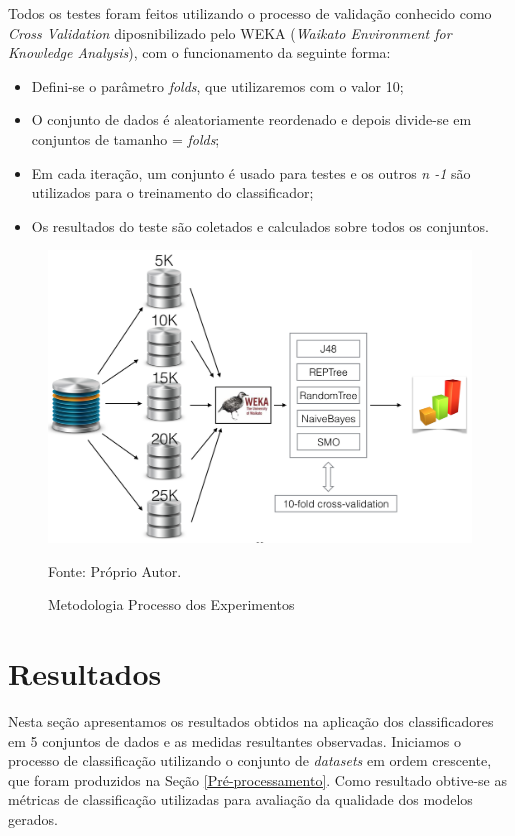 \documentclass[
	12pt,				%
	openright,			%
	oneside,	
	a4paper,				%
	english,				%
	brazil				%
]{abntex2/abntex2} %
\begin{document}
	Todos os testes foram feitos utilizando o processo de validação conhecido como \textit{Cross Validation} diposnibilizado pelo WEKA (\textit{Waikato Environment for Knowledge Analysis}), com o funcionamento da seguinte forma:
	\begin{itemize}
		\item Defini-se o parâmetro \textit{folds}, que utilizaremos com o valor 10;
		\item O conjunto de dados é aleatoriamente reordenado e depois divide-se em conjuntos de tamanho = \textit{folds};
		\item Em cada iteração, um conjunto é usado para testes e os outros \textit{n -1} são utilizados para o treinamento do classificador;
		\item Os resultados do teste são coletados e calculados sobre todos os conjuntos.
	\end{itemize}
	 
	
	\begin{figure}[!htb]
		\caption{\label{figmetodologiaExperimentos} Metodologia Processo dos Experimentos}
		\begin{center}
			\includegraphics[scale=0.55]{img/metodologiaExperimentos.png}
		\end{center}
		Fonte: Próprio Autor.
	\end{figure}
	
	\section{Resultados}
	
	Nesta seção apresentamos os resultados obtidos na aplicação dos classificadores em  5  conjuntos de dados e as medidas resultantes observadas. Iniciamos o processo de classificação utilizando o conjunto de \textit{datasets} em ordem crescente, que foram  produzidos na Seção \ref{Pré-processamento}. Como resultado obtive-se  as métricas de classificação utilizadas para avaliação da qualidade dos modelos gerados.
	
\end{document}
